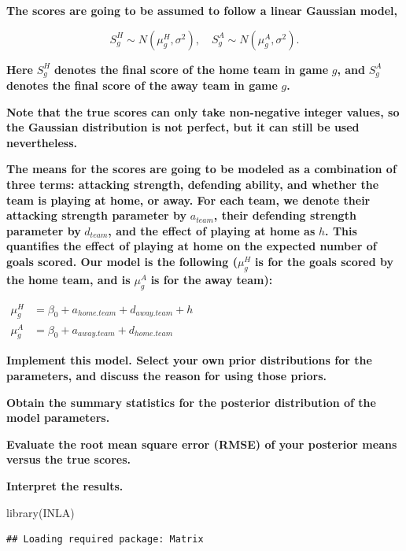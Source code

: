 \documentclass[
]{article}
\newenvironment{Shaded}{\begin{snugshade}}{\end{snugshade}}
\newcommand{\FunctionTok}[1]{\textcolor[rgb]{0.00,0.00,0.00}{#1}}
\newcommand{\NormalTok}[1]{#1}
\begin{document}
\textbf{The scores are going to be assumed to follow a linear Gaussian
model,}

\[S_g^{H}\sim N(\mu_{g}^{H},\sigma^2), \quad S_g^{A}\sim N(\mu_{g}^{A}, \sigma^2).\]

\textbf{Here} \(S_g^H\) \textbf{denotes the final score of the home team
in game} \(g\)\textbf{, and} \(S^A_g\) \textbf{denotes the final score
of the away team in game} \(g\)\textbf{.}

\textbf{Note that the true scores can only take non-negative integer
values, so the Gaussian distribution is not perfect, but it can still be
used nevertheless.}

\textbf{The means for the scores are going to be modeled as a
combination of three terms: attacking strength, defending ability, and
whether the team is playing at home, or away. For each team, we denote
their attacking strength parameter by} \(a_{team}\)\textbf{, their
defending strength parameter by} \(d_{team}\)\textbf{, and the effect of
playing at home as} \(h\)\textbf{. This quantifies the effect of playing
at home on the expected number of goals scored. Our model is the
following (}\(\mu_g^{H}\) \textbf{is for the goals scored by the home
team, and is} \(\mu_g^{A}\) \textbf{is for the away team):}

\(\begin{aligned} \mu_{g}^{H}&= \beta_0+a_{home.team}+d_{away.team}+h\\ \mu_{g}^{A}&= \beta_0+a_{away.team}+d_{home.team} \end{aligned}\)

\textbf{Implement this model. Select your own prior distributions for
the parameters, and discuss the reason for using those priors.}

\textbf{Obtain the summary statistics for the posterior distribution of
the model parameters.}

\textbf{Evaluate the root mean square error (RMSE) of your posterior
means versus the true scores.}

\textbf{Interpret the results.}

\begin{Shaded}
\begin{Highlighting}[]
\FunctionTok{library}\NormalTok{(INLA)}
\end{Highlighting}
\end{Shaded}

\begin{verbatim}
## Loading required package: Matrix
\end{verbatim}
\end{document}
